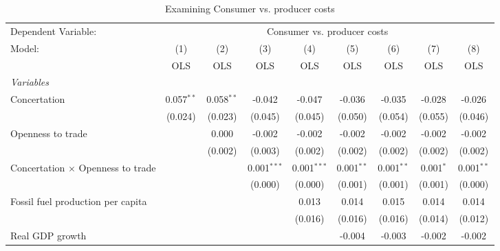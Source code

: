 
\begin{table}[htbp]
   \caption{Examining Consumer vs. producer costs}
   \centering
   \begin{tabular}{lcccccccc}
      \toprule
      Dependent Variable: & \multicolumn{8}{c}{Consumer vs. producer costs}\\
      Model:                                   & (1)          & (2)          & (3)           & (4)           & (5)          & (6)          & (7)         & (8)\\  
                                               &  OLS         & OLS          & OLS           & OLS           & OLS          & OLS          & OLS         & OLS\\  
      \midrule
      \emph{Variables}\\
      Concertation                             & 0.057$^{**}$ & 0.058$^{**}$ & -0.042        & -0.047        & -0.036       & -0.035       & -0.028      & -0.026\\   
                                               & (0.024)      & (0.023)      & (0.045)       & (0.045)       & (0.050)      & (0.054)      & (0.055)     & (0.046)\\   
      Openness to trade                        &              & 0.000        & -0.002        & -0.002        & -0.002       & -0.002       & -0.002      & -0.002\\   
                                               &              & (0.002)      & (0.003)       & (0.002)       & (0.002)      & (0.002)      & (0.002)     & (0.002)\\   
      Concertation $\times$ Openness to trade  &              &              & 0.001$^{***}$ & 0.001$^{***}$ & 0.001$^{**}$ & 0.001$^{**}$ & 0.001$^{*}$ & 0.001$^{**}$\\   
                                               &              &              & (0.000)       & (0.000)       & (0.001)      & (0.001)      & (0.001)     & (0.000)\\   
      Fossil fuel production per capita        &              &              &               & 0.013         & 0.014        & 0.015        & 0.014       & 0.014\\   
                                               &              &              &               & (0.016)       & (0.016)      & (0.016)      & (0.014)     & (0.012)\\   
      Real GDP growth                          &              &              &               &               & -0.004       & -0.003       & -0.002      & -0.002\\   

\end{tabular}
\end{table}
